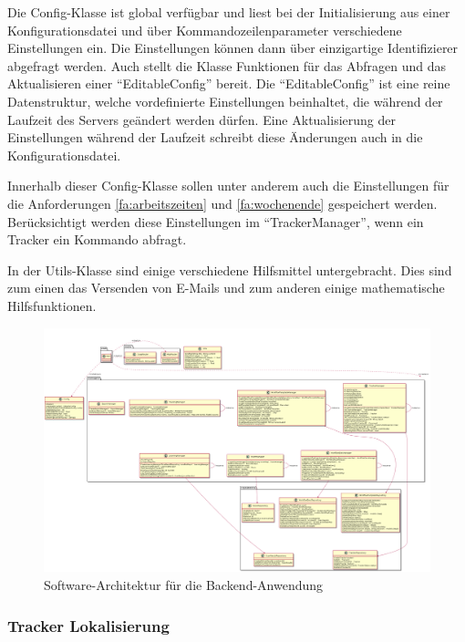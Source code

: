 Die Config-Klasse ist global verfügbar und liest bei der Initialisierung aus einer Konfigurationsdatei
und über Kommandozeilenparameter verschiedene Einstellungen ein.
Die Einstellungen können dann über einzigartige Identifizierer abgefragt werden.
Auch stellt die Klasse Funktionen für das Abfragen und das Aktualisieren einer \enquote{EditableConfig} bereit.
Die \enquote{EditableConfig} ist eine reine Datenstruktur, welche vordefinierte Einstellungen beinhaltet, die während
der Laufzeit des Servers geändert werden dürfen.
Eine Aktualisierung der Einstellungen während der Laufzeit schreibt diese Änderungen auch in die Konfigurationsdatei.

Innerhalb dieser Config-Klasse sollen unter anderem auch die Einstellungen für die Anforderungen \ref{fa:arbeitszeiten}
und \ref{fa:wochenende} gespeichert werden.
Berücksichtigt werden diese Einstellungen im \enquote{TrackerManager}, wenn ein Tracker ein Kommando abfragt.

In der Utils-Klasse sind einige verschiedene Hilfsmittel untergebracht.
Dies sind zum einen das Versenden von E-Mails und zum anderen einige mathematische Hilfsfunktionen.

\begin{figure}
	\includegraphics[width=.9\textheight]{images/server_architecture.png}
	\caption{Software-Architektur für die Backend-Anwendung}
	\label{fig:software-architecture}
\end{figure}

\FloatBarrier
\subsubsection{Tracker Lokalisierung}

